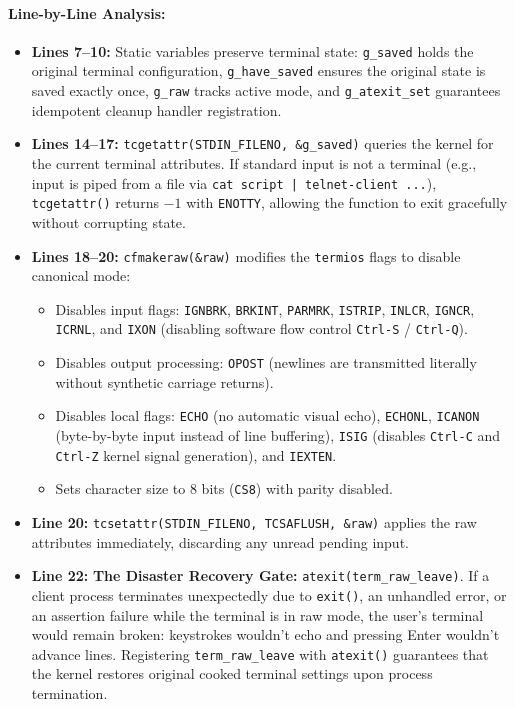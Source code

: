 \paragraph{Line-by-Line Analysis:}
\begin{itemize}[leftmargin=1.5em]
    \item \textbf{Lines 7--10:} Static variables preserve terminal state: \texttt{g\_saved} holds the original terminal configuration, \texttt{g\_have\_saved} ensures the original state is saved exactly once, \texttt{g\_raw} tracks active mode, and \texttt{g\_atexit\_set} guarantees idempotent cleanup handler registration.
    \item \textbf{Lines 14--17:} \texttt{tcgetattr(STDIN\_FILENO, \&g\_saved)} queries the kernel for the current terminal attributes. If standard input is not a terminal (e.g., input is piped from a file via \texttt{cat script | telnet-client ...}), \texttt{tcgetattr()} returns $-1$ with \texttt{ENOTTY}, allowing the function to exit gracefully without corrupting state.
    \item \textbf{Lines 18--20:} \texttt{cfmakeraw(\&raw)} modifies the \texttt{termios} flags to disable canonical mode:
    \begin{itemize}
        \item Disables input flags: \texttt{IGNBRK}, \texttt{BRKINT}, \texttt{PARMRK}, \texttt{ISTRIP}, \texttt{INLCR}, \texttt{IGNCR}, \texttt{ICRNL}, and \texttt{IXON} (disabling software flow control \texttt{Ctrl-S} / \texttt{Ctrl-Q}).
        \item Disables output processing: \texttt{OPOST} (newlines are transmitted literally without synthetic carriage returns).
        \item Disables local flags: \texttt{ECHO} (no automatic visual echo), \texttt{ECHONL}, \texttt{ICANON} (byte-by-byte input instead of line buffering), \texttt{ISIG} (disables \texttt{Ctrl-C} and \texttt{Ctrl-Z} kernel signal generation), and \texttt{IEXTEN}.
        \item Sets character size to 8 bits (\texttt{CS8}) with parity disabled.
    \end{itemize}
    \item \textbf{Line 20:} \texttt{tcsetattr(STDIN\_FILENO, TCSAFLUSH, \&raw)} applies the raw attributes immediately, discarding any unread pending input.
    \item \textbf{Line 22:} \textbf{The Disaster Recovery Gate:} \texttt{atexit(term\_raw\_leave)}. If a client process terminates unexpectedly due to \texttt{exit()}, an unhandled error, or an assertion failure while the terminal is in raw mode, the user's terminal would remain broken: keystrokes wouldn't echo and pressing Enter wouldn't advance lines. Registering \texttt{term\_raw\_leave} with \texttt{atexit()} guarantees that the kernel restores original cooked terminal settings upon process termination.
\end{itemize}

